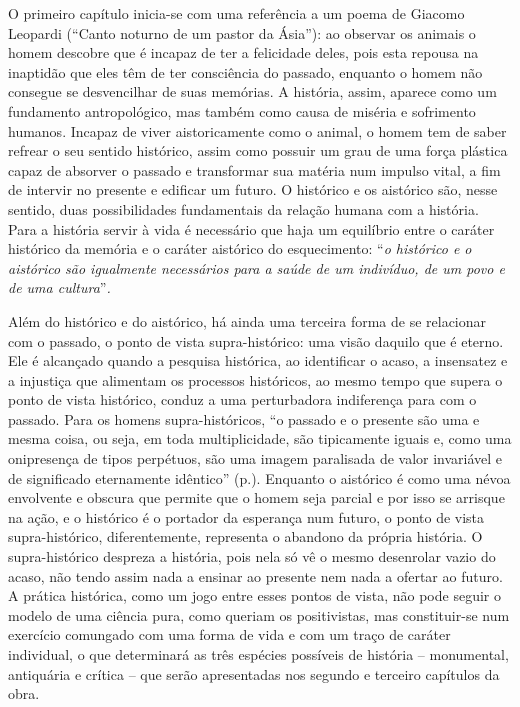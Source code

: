 O primeiro capítulo inicia-se com uma referência a um poema de Giacomo
Leopardi (``Canto noturno de um pastor da Ásia''): ao observar os
animais o homem descobre que é incapaz de ter a felicidade deles, pois
esta repousa na inaptidão que eles têm de ter consciência do passado,
enquanto o homem não consegue se desvencilhar de suas memórias. A
história, assim, aparece como um fundamento antropológico, mas também
como causa de miséria e sofrimento humanos. Incapaz de viver
aistoricamente como o animal, o homem tem de saber refrear o seu sentido
histórico, assim como possuir um grau de uma força plástica capaz de
absorver o passado e transformar sua matéria num impulso vital, a fim de
intervir no presente e edificar um futuro. O histórico e os aistórico
são, nesse sentido, duas possibilidades fundamentais da relação humana
com a história. Para a história servir à vida é necessário que haja um
equilíbrio entre o caráter histórico da memória e o caráter aistórico do
esquecimento: ``\emph{o histórico e o aistórico são igualmente
necessários para a saúde de um indivíduo, de um povo e de uma
cultura}''\emph{.}

Além do histórico e do aistórico, há ainda uma terceira forma de se
relacionar com o passado, o ponto de vista supra-histórico: uma visão
daquilo que é eterno. Ele é alcançado quando a pesquisa histórica, ao
identificar o acaso, a insensatez e a injustiça que alimentam os
processos históricos, ao mesmo tempo que supera o ponto de vista
histórico, conduz a uma perturbadora indiferença para com o passado.
Para os homens supra-históricos, ``o passado e o presente são uma e
mesma coisa, ou seja, em toda multiplicidade, são tipicamente iguais e,
como uma onipresença de tipos perpétuos, são uma imagem paralisada de
valor invariável e de significado eternamente idêntico'' (p.). Enquanto
o aistórico é como uma névoa envolvente e obscura que permite que o
homem seja parcial e por isso se arrisque na ação, e o histórico é o
portador da esperança num futuro, o ponto de vista supra-histórico,
diferentemente, representa o abandono da própria história. O
supra-histórico despreza a história, pois nela só vê o mesmo desenrolar
vazio do acaso, não tendo assim nada a ensinar ao presente nem nada a
ofertar ao futuro. A prática histórica, como um jogo entre esses pontos
de vista, não pode seguir o modelo de uma ciência pura, como queriam os
positivistas, mas constituir-se num exercício comungado com uma forma de
vida e com um traço de caráter individual, o que determinará as três
espécies possíveis de história -- monumental, antiquária e crítica --
que serão apresentadas nos segundo e terceiro capítulos da obra.


